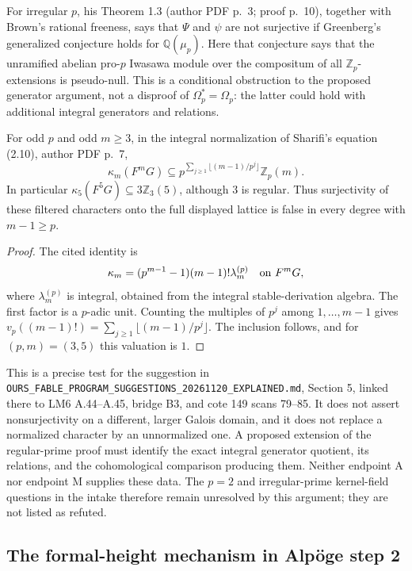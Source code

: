 For irregular $p$, his Theorem 1.3 (author PDF p.~3; proof p.~10),
together with Brown's rational freeness, says that $\Psi$ and
$\psi$ are not surjective if Greenberg's generalized conjecture
holds for $\mathbb Q(\mu_p)$. Here that conjecture says that the
unramified abelian pro-$p$ Iwasawa module over the compositum of
all $\mathbb Z_p$-extensions is pseudo-null. This is a conditional
obstruction to the proposed generator argument, not a disproof of
$\Omega_p^*=\Omega_p$: the latter could hold with additional
integral generators and relations.

\begin{proposition}
For odd $p$ and odd $m\ge3$, in the integral normalization of
Sharifi's equation (2.10), author PDF p.~7,
\[
 \kappa_m(F^mG)\subseteq
 p^{\sum_{j\ge1}\lfloor(m-1)/p^j\rfloor}\mathbb Z_p(m).
\]
In particular $\kappa_5(F^5G)\subseteq3\mathbb Z_3(5)$,
although $3$ is regular. Thus surjectivity of these filtered
characters onto the full displayed lattice is false in every
degree with $m-1\ge p$.
\end{proposition}
\begin{proof}
The cited identity is
\[
 \kappa_m=(p^{m-1}-1)(m-1)!\lambda_m^{(p)}
       \quad\hbox{on }F^mG,
\]
where $\lambda_m^{(p)}$ is integral, obtained from the integral
stable-derivation algebra. The first factor is a $p$-adic unit.
Counting the multiples of $p^j$ among $1,\ldots,m-1$ gives
$v_p((m-1)!)=\sum_{j\ge1}\lfloor(m-1)/p^j\rfloor$.
The inclusion follows, and for $(p,m)=(3,5)$ this valuation is $1$.
\end{proof}

This is a precise test for the suggestion in
\texttt{OURS\_FABLE\_PROGRAM\_SUGGESTIONS\_20261120\_EXPLAINED.md},
Section 5, linked there to LM6 A.44--A.45, bridge B3, and cote 149
scans 79--85. It does not assert nonsurjectivity on a different,
larger Galois domain, and it does not replace a normalized character
by an unnormalized one. A proposed extension of the regular-prime
proof must identify the exact integral generator quotient, its
relations, and the cohomological comparison producing them.
Neither endpoint A nor endpoint M supplies these data. The
$p=2$ and irregular-prime kernel-field questions in the intake
therefore remain unresolved by this argument; they are not listed
as refuted.

\subsection{The formal-height mechanism in Alpöge step 2}
\label{ag:formal-height}

